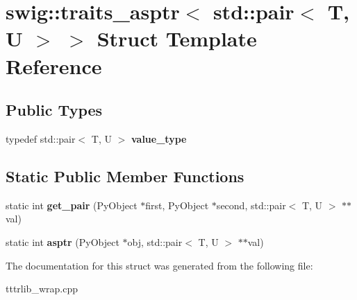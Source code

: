 \hypertarget{structswig_1_1traits__asptr_3_01std_1_1pair_3_01_t_00_01_u_01_4_01_4}{}\section{swig\+:\+:traits\+\_\+asptr$<$ std\+:\+:pair$<$ T, U $>$ $>$ Struct Template Reference}
\label{structswig_1_1traits__asptr_3_01std_1_1pair_3_01_t_00_01_u_01_4_01_4}
\subsection*{Public Types}
\begin{DoxyCompactItemize}
\item 
\mbox{\label{structswig_1_1traits__asptr_3_01std_1_1pair_3_01_t_00_01_u_01_4_01_4_a1cc2b1f24022176235ac0ede7646c041}} 
typedef std\+::pair$<$ T, U $>$ {\bfseries value\+\_\+type}
\end{DoxyCompactItemize}
\subsection*{Static Public Member Functions}
\begin{DoxyCompactItemize}
\item 
\mbox{\label{structswig_1_1traits__asptr_3_01std_1_1pair_3_01_t_00_01_u_01_4_01_4_a7ba7929bef6f511c92ff9a847edf9bf0}} 
static int {\bfseries get\+\_\+pair} (Py\+Object $\ast$first, Py\+Object $\ast$second, std\+::pair$<$ T, U $>$ $\ast$$\ast$val)
\item 
\mbox{\label{structswig_1_1traits__asptr_3_01std_1_1pair_3_01_t_00_01_u_01_4_01_4_a331a484c8263c370bd86a3a2d655614a}} 
static int {\bfseries asptr} (Py\+Object $\ast$obj, std\+::pair$<$ T, U $>$ $\ast$$\ast$val)
\end{DoxyCompactItemize}


The documentation for this struct was generated from the following file\+:\begin{DoxyCompactItemize}
\item 
tttrlib\+\_\+wrap.\+cpp\end{DoxyCompactItemize}
